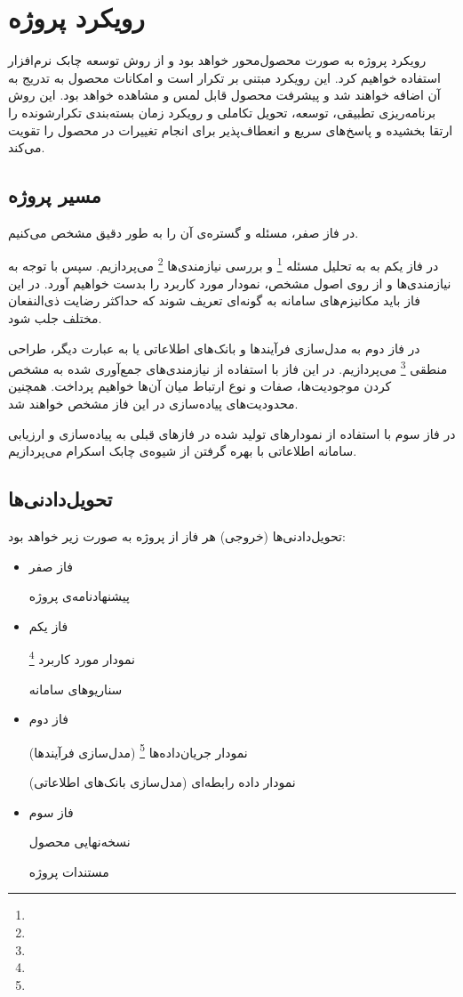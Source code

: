 \section{رویکرد پروژه}
رویکرد پروژه به صورت محصول‌محور خواهد بود و از روش توسعه چابک نرم‌افزار استفاده خواهیم کرد. 
این رویکرد مبتنی بر تکرار است و امکانات محصول به تدریج به آن اضافه خواهند شد و پیشرفت محصول قابل لمس و مشاهده خواهد بود. 
این روش برنامه‌ریزی تطبیقی، توسعه، تحویل تکاملی و رویکرد زمان بسته‌بندی تکرارشونده را ارتقا بخشیده و پاسخ‌های سریع و انعطاف‌پذیر برای انجام تغییرات در محصول را تقویت می‌کند.

\subsection{مسیر پروژه}

در فاز صفر، مسئله و گستره‌ی آن را به طور دقیق مشخص می‌کنیم.

در فاز یکم به به تحلیل مسئله
\footnote{}
و بررسی نیازمندی‌ها
\footnote{}
می‌پردازیم.
سپس با توجه به نیازمندی‌ها و از روی اصول مشخص، نمودار مورد کاربرد را بدست خواهیم آورد. در این فاز باید مکانیزم‌های سامانه به گونه‌ای تعریف شوند که حداکثر رضایت ذی‌النفعان مختلف جلب شود.

در فاز دوم به مدل‌سازی فرآیندها و بانک‌های اطلاعاتی یا به عبارت دیگر، طراحی منطقی
\footnote{}
می‌پردازیم. در این فاز با استفاده از نیازمندی‌های جمع‌آوری شده به مشخص کردن موجودیت‌ها، صفات و نوع ارتباط میان آن‌ها خواهیم پرداخت. همچنین محدودیت‌های پیاده‌سازی در این فاز مشخص خواهند شد.

در فاز سوم با استفاده از نمودار‌های تولید شده در فاز‌های قبلی به پیاده‌سازی و ارزیابی سامانه اطلاعاتی با بهره گرفتن از شیوه‌ی چابک اسکرام می‌پردازیم.

\newpage
\subsection{تحویل‌دادنی‌ها}
تحویل‌دادنی‌ها (خروجی) هر فاز از پروژه به صورت زیر خواهد بود:

\begin{itemize}
    \item فاز صفر
    
    پیشنهادنامه‌ی پروژه
    \item فاز یکم
    
    نمودار مورد کاربرد
    \footnote{}
    
    سناریوهای سامانه
    \item فاز دوم
    
    نمودار جریان‌داده‌ها
    \footnote{} 
    (مدل‌سازی فرآیند‌ها)
    
    نمودار داده رابطه‌ای (مدل‌سازی بانک‌های اطلاعاتی)
    \item فاز سوم
    
    نسخه‌نهایی محصول
    
    مستندات پروژه
    
\end{itemize}
